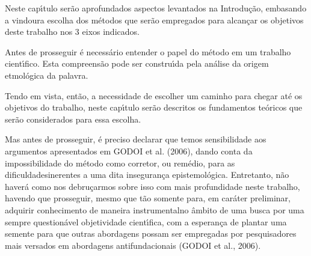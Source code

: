 \documentclass[
12pt,		%
openright,	%
twoside,  %
a4paper,			%
chapter=TITLE,		%
english,			%
french,				%
spanish,			%
brazil				%
]{USPSC-classe/USPSC}
\begin{document}
Neste cap\'{\i}tulo ser\~ao aprofundados aspectos levantados na Introdu\c{c}\~ao, embasando a vindoura escolha dos m\'etodos que ser\~ao empregados para alcan\c{c}ar os objetivos deste trabalho nos 3 eixos indicados.




Antes de prosseguir \'e necess\'ario entender o papel do m\'etodo em um trabalho cient\'{\i}fico. Esta compreens\~ao pode ser constru\'{\i}da pela an\'alise da origem etmol\'ogica da palavra.





\noindent\begin{center}\mbox{\centering{}}\end{center}


Tendo em vista, ent\~ao, a necessidade de escolher um caminho para chegar at\'e os objetivos do trabalho, neste cap\'{\i}tulo ser\~ao descritos os fundamentos te\'oricos que ser\~ao considerados para essa escolha.




Mas antes de prosseguir, \'e preciso declarar que temos sensibilidade aos argumentos apresentados em  GODOI et al. (2006), dando conta da impossibilidade \textquotedbl do m\'etodo como corretor, ou rem\'edio, para as dificuldades\textquotedbl  inerentes a uma dita \textquotedbl inseguran\c{c}a epistemol\'ogica\textquotedbl . Entretanto, n\~ao haver\'a como nos debru\c{c}armos sobre isso com mais profundidade neste trabalho, havendo que prosseguir, mesmo que t\~ao somente para, em car\'ater preliminar, \textquotedbl adquirir conhecimento de maneira instrumental\textquotedbl  no \^ambito de uma busca por uma sempre question\'avel \textquotedbl objetividade cient\'{\i}fica\textquotedbl , com a esperan\c{c}a de plantar uma semente para que outras abordagens possam ser empregadas por  pesquisadores mais versados em abordagens antifundacionais  (GODOI et al., 2006).
\end{document}
